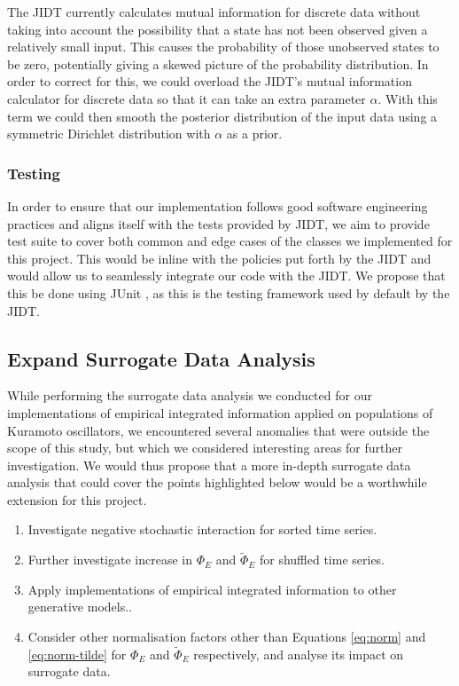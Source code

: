 \documentclass[a4paper,11pt]{article}
\begin{document}
The JIDT currently calculates mutual information for discrete data without taking into account the possibility that a state has not been observed given a relatively small input. This causes the probability of those unobserved states to be zero, potentially giving a skewed picture of the probability distribution. In order to correct for this, we could overload the JIDT's mutual information calculator for discrete data so that it can take an extra parameter $\alpha$. With this term we could then smooth the posterior distribution of the input data using a symmetric Dirichlet distribution with $\alpha$ as a prior.

\subsubsection{Testing}
\label{sec:fw:jidt:testing}
In order to ensure that our implementation follows good software engineering practices and aligns itself with the tests provided by JIDT, we aim to provide test suite to cover both common and edge cases of the classes we implemented for this project. This would be inline with the policies put forth by the JIDT and would allow us to seamlessly integrate our code with the JIDT. We propose that this be done using JUnit \cite{JUnit}, as this is the testing framework used by default by the JIDT.

\subsection{Expand Surrogate Data Analysis}
\label{sec:fw:surrogate}
While performing the surrogate data analysis we conducted for our implementations of empirical integrated information applied on populations of Kuramoto oscillators, we encountered several anomalies that were outside the scope of this study, but which we considered interesting areas for further investigation. We would thus propose that a more in-depth surrogate data analysis that could cover the points highlighted below would be a worthwhile extension for this project.

\begin{enumerate}
\item{Investigate negative stochastic interaction for sorted time series.}
\item{Further investigate increase in $\Phi_E$ and $\widetilde{\Phi}_E$ for shuffled time series.}
\item{Apply implementations of empirical integrated information to other generative models.}.
\item{Consider other normalisation factors other than Equations \ref{eq:norm} and \ref{eq:norm-tilde} for $\Phi_E$ and $\widetilde{\Phi}_E$ respectively, and analyse its impact on surrogate data.}
\end{enumerate}
\end{document}
